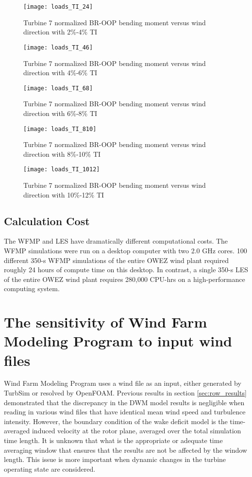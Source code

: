 \documentclass{umthesis}
\begin{document}
\begin{figure}
  \centering
  \texttt{[image: loads\_TI\_24]}
  \caption{Turbine 7 normalized BR-OOP bending moment versus wind direction with 2\%-4\% TI}\label{fig:loads_TI_24}
\end{figure}

\begin{figure}
  \centering
  \texttt{[image: loads\_TI\_46]}
  \caption{Turbine 7 normalized BR-OOP bending moment versus wind direction with 4\%-6\% TI}\label{fig:loads_TI_46}
\end{figure}

\begin{figure}
  \centering
  \texttt{[image: loads\_TI\_68]}
  \caption{Turbine 7 normalized BR-OOP bending moment versus wind direction with 6\%-8\% TI}\label{fig:loads_TI_68}
\end{figure}

\begin{figure}
  \centering
  \texttt{[image: loads\_TI\_810]}
  \caption{Turbine 7 normalized BR-OOP bending moment versus wind direction with 8\%-10\% TI}\label{fig:loads_TI_810}
\end{figure}

\begin{figure}
  \centering
  \texttt{[image: loads\_TI\_1012]}
  \caption{Turbine 7 normalized BR-OOP bending moment versus wind direction with 10\%-12\% TI}\label{fig:loads_TI_1012}
\end{figure}

\subsection{Calculation Cost}
The WFMP and LES have dramatically different computational costs. The WFMP simulations were run on a desktop computer with two 2.0 GHz cores. 100 different 350-s WFMP simulations of the entire OWEZ wind plant required roughly 24 hours of compute time on this desktop. In contrast, a single 350-s LES of the entire OWEZ wind plant requires 280,000 CPU-hrs on a high-performance computing system.

\section{The sensitivity of Wind Farm Modeling Program to input wind files}\label{sec:DWM_sensitivity}
Wind Farm Modeling Program uses a wind file as an input, either generated by TurbSim or resolved by OpenFOAM. Previous results in section \ref{sec:row_results} demonstrated that the discrepancy in the DWM model results is negligible when reading in various wind files that have identical mean wind speed and turbulence intensity. However, the boundary condition of the wake deficit model is the time-averaged induced velocity at the rotor plane, averaged over the total simulation time length. It is unknown that what is the appropriate or adequate time averaging window that ensures that the results are not be affected by the window length. This issue is more important when dynamic changes in the turbine operating state are considered.
\end{document}
